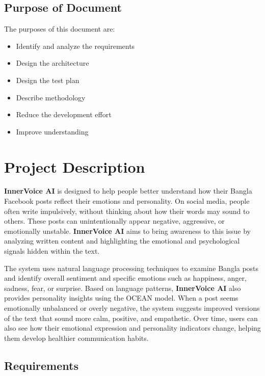 \documentclass[12pt,a4paper]{report}
\begin{document}
\section{Purpose of Document}

The purposes of this document are:

\begin{itemize}
    \item Identify and analyze the requirements
    \item Design the architecture
    \item Design the test plan
    \item Describe methodology
    \item Reduce the development effort
    \item Improve understanding
\end{itemize}

\chapter{Project Description}

\textbf{InnerVoice AI} is designed to help people better understand how their Bangla Facebook posts reflect their emotions and personality. On social media, people often write impulsively, without thinking about how their words may sound to others. These posts can unintentionally appear negative, aggressive, or emotionally unstable. \textbf{InnerVoice AI} aims to bring awareness to this issue by analyzing written content and highlighting the emotional and psychological signals hidden within the text.

The system uses natural language processing techniques to examine Bangla posts and identify overall sentiment and specific emotions such as happiness, anger, sadness, fear, or surprise. Based on language patterns, \textbf{InnerVoice AI} also provides personality insights using the OCEAN model. When a post seems emotionally unbalanced or overly negative, the system suggests improved versions of the text that sound more calm, positive, and empathetic. Over time, users can also see how their emotional expression and personality indicators change, helping them develop healthier communication habits.

\section{Requirements}
\end{document}
